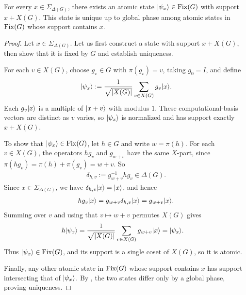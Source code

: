\begin{lemma}\label{lem:atomic-existence}
    For every $x\in\Sigma_{\Delta(G)}$, there exists an atomic state $\ket{\psi_x}\in\Fix(G)$ with support $x+X(G)$.
    This state is unique up to global phase among atomic states in $\Fix(G)$ whose support contains $x$.
\end{lemma}
\begin{proof}
    Let $x \in \Sigma_{\Delta(G)}$. Let us first construct a state with support $x+X(G)$, then show that it is fixed by $G$ and establish uniqueness.

    For each $v\in X(G)$, choose $g_v\in G$ with $\pi(g_v)=v$, taking $g_0=I$, and define
    \begin{align} \label{eq:atomic-state}
        \ket{\psi_x}
        :=\frac{1}{\sqrt{|X(G)|}}
        \sum_{v\in X(G)}g_v\ket{x}.
    \end{align}
    Each $g_v\ket{x}$ is a multiple of $\ket{x+v}$ with modulus $1$.
    These computational-basis vectors are distinct as $v$ varies, so $\ket{\psi_x}$ is normalized and has support exactly $x+X(G)$.

    To show that $\ket{\psi_x}\in\Fix(G)$, let $h\in G$ and write $w=\pi(h)$.
    For each $v\in X(G)$, the operators $hg_v$ and $g_{w+v}$ have the same $X$-part, since $\pi(hg_v) = \pi(h) + \pi(g_v) = w+v$. So
    \begin{align}
        \delta_{h,v}:=g_{w+v}^{-1}hg_v\in\Delta(G).
    \end{align}
    Since $x\in\Sigma_{\Delta(G)}$, we have $\delta_{h,v}\ket{x}=\ket{x}$, and hence
    \begin{align}
        hg_v\ket{x}
        =g_{w+v}\delta_{h,v}\ket{x}
        =g_{w+v}\ket{x}.
    \end{align}
    Summing over $v$ and using that $v\mapsto w+v$ permutes $X(G)$ gives
    \begin{align}
        h\ket{\psi_x}
        &=\frac{1}{\sqrt{|X(G)|}}
          \sum_{v\in X(G)}g_{w+v}\ket{x}
        =\ket{\psi_x}.
    \end{align}
    Thus $\ket{\psi_x}\in\Fix(G)$, and its support is a single coset of $X(G)$, so it is atomic.

    Finally, any other atomic state in $\Fix(G)$ whose support contains $x$ has support intersecting that of $\ket{\psi_x}$.
    By , the two states differ only by a global phase, proving uniqueness.
\end{proof}


